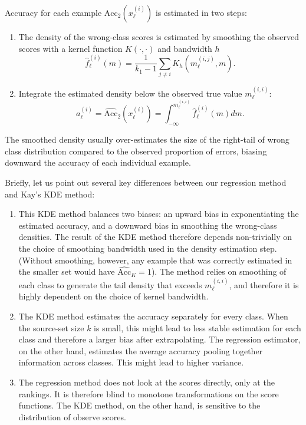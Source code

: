 \documentclass[twoside,11pt]{article}
\begin{document}
Accuracy for each example $\mathrm{Acc}_2(x_\ell^{(i)})$ is estimated in two steps:
\begin{enumerate}
\item The density of the wrong-class scores is estimated by smoothing the observed scores with a kernel function $K(\cdot,\cdot)$ and bandwidth $h$
\[\hat{f}_\ell^{(i)}(m) = \frac{1}{k_1-1} \sum_{j\neq i} K_h(m_\ell^{(i,j)}, m).\]
\item Integrate the estimated density below the observed true value $m_\ell^{(i,i)}$:
\[a_\ell^{(i)} = \widehat{\mathrm{Acc}}_2(x_\ell^{(i)}) = \int_{-\infty}^{m_\ell^{(i,i)}} \hat{f}_\ell^{(i)}(m)dm.\]
\end{enumerate}
The smoothed density usually over-estimates the size of the right-tail of wrong class distribution compared
to the observed proportion of errors, biasing downward the accuracy of each individual example. 

Briefly, let us point out several key differences between our regression method and Kay's KDE method: 
\begin{enumerate}
\item This KDE method balances two biases: an upward bias in exponentiating the estimated accuracy, and a downward bias 
in smoothing the wrong-class densities. The result of the KDE method therefore depends non-trivially on the choice of smoothing bandwidth used in the density estimation step. 
(Without smoothing, however, any example that was correctly estimated in the smaller set would have $\widehat{\mathrm{Acc}}_K = 1$). The method relies on smoothing of each class to generate the tail density that exceeds $m_\ell^{(i,i)}$, and therefore it is highly dependent on the choice of kernel bandwidth. 

\item The KDE method estimates the accuracy separately for every class. When the source-set size $k$ is small, this might lead to less stable estimation for each class 
and therefore a larger bias after extrapolating. The regression estimator, on the other hand, estimates the average accuracy pooling together information across classes. This might lead to higher variance. 

\item The regression method does not look at the scores directly, only at the rankings. It is therefore blind to monotone transformations 
on the score functions. The KDE method, on the other hand, is sensitive to the distribution of observe scores. 
\end{enumerate}
\end{document}
